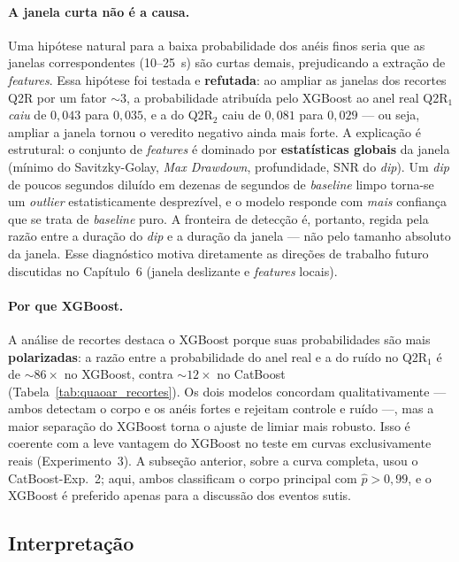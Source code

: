 \documentclass[msc]{on} %
\begin{document}
\paragraph{A janela curta não é a causa.} Uma hipótese natural para a baixa probabilidade dos anéis finos seria que as janelas correspondentes (10--25~s) são curtas demais, prejudicando a extração de \textit{features}. Essa hipótese foi testada e \textbf{refutada}: ao ampliar as janelas dos recortes Q2R por um fator $\sim 3$, a probabilidade atribuída pelo XGBoost ao anel real Q2R$_1$ \emph{caiu} de $0{,}043$ para $0{,}035$, e a do Q2R$_2$ caiu de $0{,}081$ para $0{,}029$ --- ou seja, ampliar a janela tornou o veredito negativo ainda mais forte. A explicação é estrutural: o conjunto de \textit{features} é dominado por \textbf{estatísticas globais} da janela (mínimo do Savitzky-Golay, \textit{Max Drawdown}, profundidade, SNR do \textit{dip}). Um \textit{dip} de poucos segundos diluído em dezenas de segundos de \textit{baseline} limpo torna-se um \textit{outlier} estatisticamente desprezível, e o modelo responde com \emph{mais} confiança que se trata de \textit{baseline} puro. A fronteira de detecção é, portanto, regida pela razão entre a duração do \textit{dip} e a duração da janela --- não pelo tamanho absoluto da janela. Esse diagnóstico motiva diretamente as direções de trabalho futuro discutidas no Capítulo~6 (janela deslizante e \textit{features} locais).

\paragraph{Por que XGBoost.} A análise de recortes destaca o XGBoost porque suas probabilidades são mais \textbf{polarizadas}: a razão entre a probabilidade do anel real e a do ruído no Q2R$_1$ é de $\sim 86\times$ no XGBoost, contra $\sim 12\times$ no CatBoost (Tabela~\ref{tab:quaoar_recortes}). Os dois modelos concordam qualitativamente --- ambos detectam o corpo e os anéis fortes e rejeitam controle e ruído ---, mas a maior separação do XGBoost torna o ajuste de limiar mais robusto. Isso é coerente com a leve vantagem do XGBoost no teste em curvas exclusivamente reais (Experimento~3). A subseção anterior, sobre a curva completa, usou o CatBoost-Exp.~2; aqui, ambos classificam o corpo principal com $\hat{p}>0{,}99$, e o XGBoost é preferido apenas para a discussão dos eventos sutis.

\subsection{Interpretação}
\end{document}
